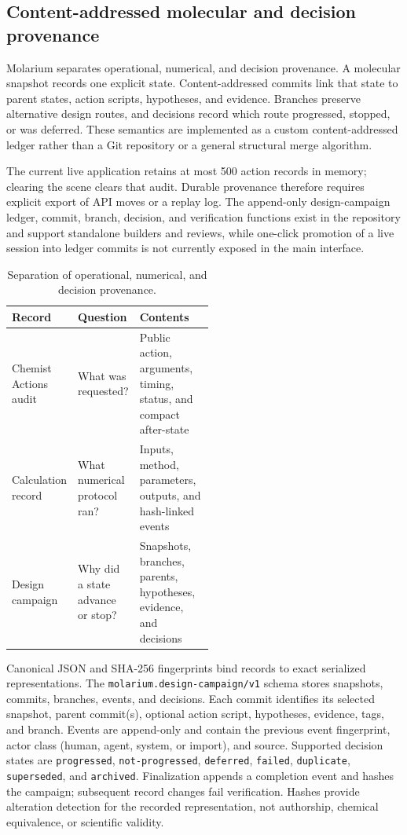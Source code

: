 \documentclass[11pt]{article}
\begin{document}
\begin{small}
\subsection{Content-addressed molecular and decision provenance}

Molarium separates operational, numerical, and decision provenance. A molecular snapshot records one explicit state. Content-addressed commits link that state to parent states, action scripts, hypotheses, and evidence. Branches preserve alternative design routes, and decisions record which route progressed, stopped, or was deferred. These semantics are implemented as a custom content-addressed ledger rather than a Git repository or a general structural merge algorithm.

The current live application retains at most 500 action records in memory; clearing the scene clears that audit. Durable provenance therefore requires explicit export of API moves or a replay log. The append-only design-campaign ledger, commit, branch, decision, and verification functions exist in the repository and support standalone builders and reviews, while one-click promotion of a live session into ledger commits is not currently exposed in the main interface.

\begin{table}[htbp]
\centering\small
\caption{Separation of operational, numerical, and decision provenance.}
\label{tab:appA_provenance}
\begin{tabularx}{\linewidth}{@{}p{0.24\linewidth}p{0.27\linewidth}X@{}}
\toprule
\textbf{Record} & \textbf{Question} & \textbf{Contents}\\
\midrule
Chemist Actions audit & What was requested? & Public action, arguments, timing, status, and compact after-state\\
Calculation record & What numerical protocol ran? & Inputs, method, parameters, outputs, and hash-linked events\\
Design campaign & Why did a state advance or stop? & Snapshots, branches, parents, hypotheses, evidence, and decisions\\
\bottomrule
\end{tabularx}
\end{table}

Canonical JSON and SHA-256 fingerprints bind records to exact serialized representations. The \texttt{molarium.design-campaign/v1} schema stores snapshots, commits, branches, events, and decisions. Each commit identifies its selected snapshot, parent commit(s), optional action script, hypotheses, evidence, tags, and branch. Events are append-only and contain the previous event fingerprint, actor class (human, agent, system, or import), and source. Supported decision states are \texttt{progressed}, \texttt{not-progressed}, \texttt{deferred}, \texttt{failed}, \texttt{duplicate}, \texttt{superseded}, and \texttt{archived}. Finalization appends a completion event and hashes the campaign; subsequent record changes fail verification. Hashes provide alteration detection for the recorded representation, not authorship, chemical equivalence, or scientific validity.


\end{small}
\end{document}
